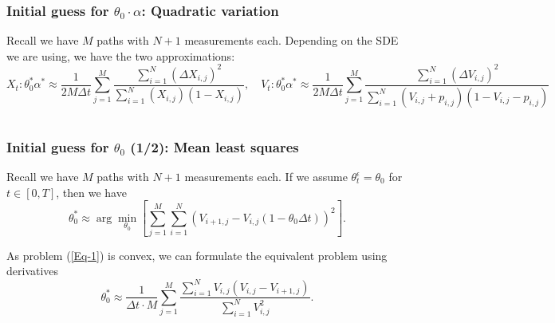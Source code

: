 \documentclass[aspectratio=169]{beamer}\usepackage[utf8]{inputenc}
\begin{document}

\begin{frame}\frametitle{Initial guess for $\theta_0\cdot\alpha$: Quadratic variation}

Recall we have $M$ paths with $N+1$ measurements each. Depending on the SDE we are using, we have the two approximations:
{\footnotesize
\begin{equation*}
X_t:\theta_0^*\alpha^*\approx \frac{1}{2M\Delta t} \sum\limits_{j=1}^M \frac{ \sum\limits_{i=1}^{N} (\Delta X_{i,j})^2}{\sum\limits_{i=1}^{N} (X_{i,j})(1-X_{i,j})},\quad V_t:\theta_0^*\alpha^*\approx \frac{1}{2M\Delta t} \sum\limits_{j=1}^M \frac{ \sum\limits_{i=1}^{N} (\Delta V_{i,j})^2}{\sum\limits_{i=1}^{N} (V_{i,j}+p_{i,j})(1-V_{i,j}-p_{i,j})}
\end{equation*}
}
\begin{center}
\begin{tabular}{|c|}
\toprule
{\tiny

}\\
\bottomrule
\end{tabular}
\end{center}

\end{frame}


\begin{frame}\frametitle{Initial guess for $\theta_0$ (1/2): Mean least squares} \label{VF}
Recall we have $M$ paths with $N+1$ measurements each. If we assume $\theta_t^\epsilon=\theta_0$ for $t\in[0,T]$, then we have
\begin{equation}
\theta_0^*\approx\arg\min_{\theta_0}{\left[\sum_{j=1}^M\sum_{i=1}^N\left(V_{i+1,j}-V_{i,j}(1-\theta_0\Delta t)\right)^2\right]}.
\label{Eq-1}
\end{equation}

%

As problem (\ref{Eq-1}) is convex, we can formulate the equivalent problem using derivatives
\begin{equation*}
\theta_0^*\approx\frac{1}{\Delta t\cdot M}\sum_{j=1}^M\frac{\sum_{i=1}^NV_{i,j}(V_{i,j}-V_{i+1,j})}{\sum_{i=1}^NV_{i,j}^2}.
\end{equation*}

\end{frame}
\end{document}
